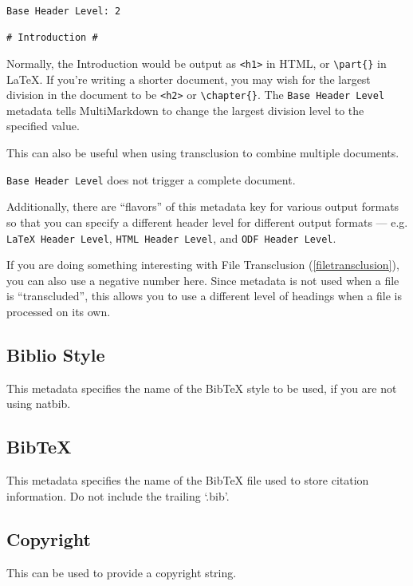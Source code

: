 \begin{verbatim}
Base Header Level: 2

# Introduction #
\end{verbatim}

Normally, the Introduction would be output as \texttt{<h1>} in HTML, or \texttt{\textbackslash{}part\{\}} in LaTeX. If you're writing a shorter document, you may wish for the largest division in the document to be \texttt{<h2>} or \texttt{\textbackslash{}chapter\{\}}. The \texttt{Base Header Level} metadata tells MultiMarkdown to change the largest division level to the specified value.

This can also be useful when using transclusion to combine multiple documents.

\texttt{Base Header Level} does not trigger a complete document.

Additionally, there are ``flavors'' of this metadata key for various output formats so that you can specify a different header level for different output formats --- e.g. \texttt{LaTeX Header Level}, \texttt{HTML Header Level}, and \texttt{ODF Header Level}.

If you are doing something interesting with File Transclusion (\autoref{filetransclusion}), you can also use a negative number here. Since metadata is not used when a file is ``transcluded'', this allows you to use a different level of headings when a file is processed on its own.

\subsection{Biblio Style}
\label{bibliostyle}

This metadata specifies the name of the BibTeX style to be used, if you are
not using natbib.

\subsection{BibTeX}
\label{bibtex}

This metadata specifies the name of the BibTeX file used to store citation
information. Do not include the trailing `.bib'.

\subsection{Copyright}
\label{copyright}

This can be used to provide a copyright string.

